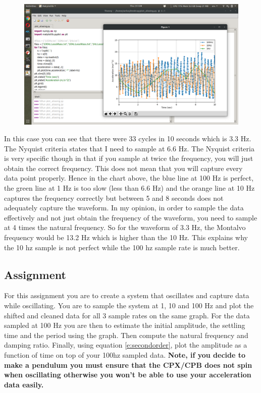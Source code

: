\begin{figure}[H]
  \begin{center}
    \includegraphics[width=\textwidth]{Figures/aliasing2.png}
  \end{center}
\end{figure}
In this case you can see that there were 33 cycles in 10 seconds which is 3.3 Hz. The Nyquist criteria states that I need to sample at 6.6 Hz. The Nyquist criteria is very specific though in that if you sample at twice the frequency, you will just obtain the correct frequency. This does not mean that you will capture every data point properly. Hence in the chart above, the blue line at 100 Hz is perfect, the green line at 1 Hz is too slow (less than 6.6 Hz) and the orange line at 10 Hz captures the frequency correctly but between 5 and 8 seconds does not adequately capture the waveform. In my opinion, in order to sample the data effectively and not just obtain the frequency of the waveform, you need to sample at 4 times the natural frequency. So for the waveform of 3.3 Hz, the Montalvo frequency would be 13.2 Hz which is higher than the 10 Hz. This explains why the 10 hz sample is not perfect while the 100 hz sample rate is much better. 

\subsection{Assignment}

For this assignment you are to create a system that oscillates and capture data while oscillating. You are to sample the system at 1, 10 and 100 Hz and plot the shifted and cleaned data for all 3 sample rates on the same graph. For the data sampled at 100 Hz you are then to estimate the initial amplitude, the settling time  and the period using the graph. Then compute the natural frequency and damping ratio. Finally, using equation \ref{e:secondorder}, plot the amplitude as a function of time on top of your 100hz sampled data. {\bf Note, if you decide to make a pendulum you must ensure that the CPX/CPB does not spin when oscillating otherwise you won't be able to use your acceleration data easily.}

